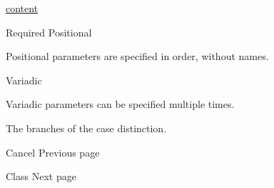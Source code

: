 \href{/docs/reference/foundations/content/}{content}

{Required} {{ Positional }}

\label{parameters-children-positional-tooltip}
Positional parameters are specified in order, without names.

{{ Variadic }}

\label{parameters-children-variadic-tooltip}
Variadic parameters can be specified multiple times.

The branches of the case distinction.

\href{/docs/reference/math/cancel/}{\pandocbounded{}}

{ Cancel } { Previous page }

\href{/docs/reference/math/class/}{\pandocbounded{}}

{ Class } { Next page }
